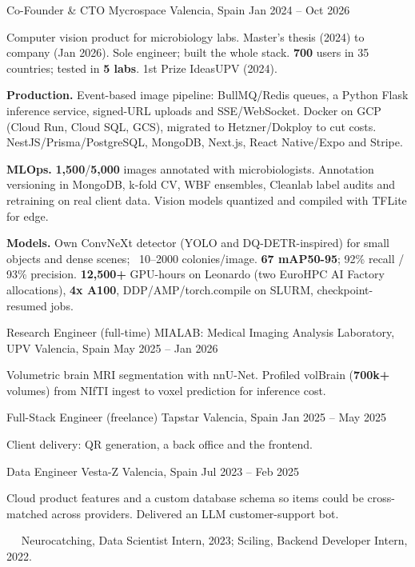 \documentclass[11pt, a4paper]{../awesome-cv}
\begin{document}
\begin{cventries}
\cvkeep
\cventry
    {Co-Founder \& CTO}
    {Mycrospace}
    {Valencia, Spain}
    {Jan 2024 – Oct 2026}
    {
\begin{cvitems}
\item {Computer vision product for microbiology labs. Master's thesis (2024) to company (Jan 2026). Sole engineer; built the whole stack. \textbf{700} users in 35 countries; tested in \textbf{5 labs}. 1st Prize IdeasUPV (2024).}
\item {\textbf{Production.} Event-based image pipeline: BullMQ/Redis queues, a Python Flask inference service, signed-URL uploads and SSE/WebSocket. Docker on GCP (Cloud Run, Cloud SQL, GCS), migrated to Hetzner/Dokploy to cut costs. NestJS/Prisma/PostgreSQL, MongoDB, Next.js, React Native/Expo and Stripe.}
\item {\textbf{MLOps.} \textbf{1,500}/\textbf{5,000} images annotated with microbiologists. Annotation versioning in MongoDB, k-fold CV, WBF ensembles, Cleanlab label audits and retraining on real client data. Vision models quantized and compiled with TFLite for edge.}
\item {\textbf{Models.} Own ConvNeXt detector (YOLO and DQ-DETR-inspired) for small objects and dense scenes; ~10–2000 colonies/image. \textbf{67 mAP50-95}; 92\% recall / 93\% precision. \textbf{12,500+} GPU-hours on Leonardo (two EuroHPC AI Factory allocations), \textbf{4x A100}, DDP/AMP/torch.compile on SLURM, checkpoint-resumed jobs.}
\end{cvitems}
    }
\cvkeep
\cventry
    {Research Engineer (full-time)}
    {MIALAB: Medical Imaging Analysis Laboratory, UPV}
    {Valencia, Spain}
    {May 2025 – Jan 2026}
    {
\begin{cvitems}
\item {Volumetric brain MRI segmentation with nnU-Net. Profiled volBrain (\textbf{700k+} volumes) from NIfTI ingest to voxel prediction for inference cost.}
\end{cvitems}
    }
\cvkeep
\cventry
    {Full-Stack Engineer (freelance)}
    {Tapstar}
    {Valencia, Spain}
    {Jan 2025 – May 2025}
    {
\begin{cvitems}
\item {Client delivery: QR generation, a back office and the frontend.}
\end{cvitems}
    }
\cvkeep
\cventry
    {Data Engineer}
    {Vesta-Z}
    {Valencia, Spain}
    {Jul 2023 – Feb 2025}
    {
\begin{cvitems}
\item {Cloud product features and a custom database schema so items could be cross-matched across providers. Delivered an LLM customer-support bot.}
\end{cvitems}
    }
\end{cventries}
\vspace{0.4mm}
~~{\fontsize{8pt}{1em}\bodyfontlight\color{text} Neurocatching, Data Scientist Intern, 2023; Sciling, Backend Developer Intern, 2022.}\par
\end{document}
